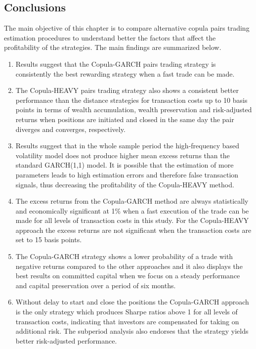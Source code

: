 \documentclass[a4paper,12pt]{report}
\begin{document}
\begin{refsection}
\vspace{0.6cm}

\section{Conclusions}

The main objective of this chapter is to compare alternative copula pairs trading estimation procedures to understand better the factors that affect the profitability of the strategies. The main findings are summarized below.

\begin{enumerate}
	\item Results suggest that the Copula-GARCH pairs trading strategy is consistently the best rewarding strategy when a fast trade can be made.
	\item The Copula-HEAVY pairs trading strategy also shows a consistent better performance than the distance strategies for transaction costs up to 10 basis points in terms of wealth accumulation, wealth preservation and risk-adjusted returns when positions are initiated and closed in the same day the pair diverges and converges, respectively. 
	\item Results suggest that in the whole sample period the high-frequency based volatility model does not produce higher mean excess returns than the standard GARCH(1,1) model. It is possible that the estimation of more parameters leads to high estimation errors and therefore false transaction signals, thus decreasing the profitability of the Copula-HEAVY method.
	\item The excess returns from the Copula-GARCH method are always statistically and economically significant at 1\% when a fast execution of the trade can be made for all levels of transaction costs in this study. For the Copula-HEAVY approach the excess returns are not significant when the transaction costs are set to 15 basis points. 
	\item The Copula-GARCH strategy shows a lower probability of a trade with negative returns compared to the other approaches and it also displays the best results on committed capital when we focus on a steady performance and capital preservation over a period of six months.
	\item Without delay to start and close the positions the Copula-GARCH approach is the only strategy which produces Sharpe ratios above 1 for all levels of transaction costs, indicating that investors are compensated for taking on additional risk. The subperiod analysis also endorses that the strategy yields better risk-adjusted performance.

\end{enumerate}
\end{refsection}
\end{document}
